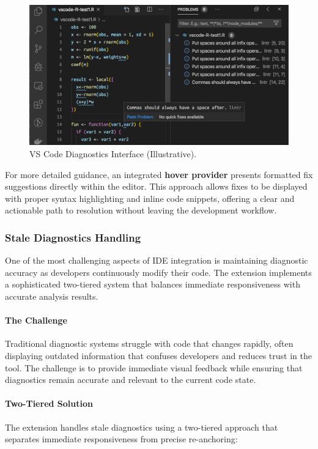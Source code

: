 \begin{spacing}{1.2}
\begin{figure}[H]
    \centering
    \includegraphics[scale=0.4]{Images/vscode_diagnostics.png}
    \caption{VS Code Diagnostics Interface (Illustrative).}
    \label{fig:diagnostics_example}
\end{figure}

For more detailed guidance, an integrated \textbf{hover provider} presents formatted fix suggestions directly within the editor. This approach allows fixes to be displayed with proper syntax highlighting and inline code snippets, offering a clear and actionable path to resolution without leaving the development workflow.

\subsubsection{Stale Diagnostics Handling}
One of the most challenging aspects of IDE integration is maintaining diagnostic accuracy as developers continuously modify their code. The extension implements a sophisticated two-tiered system that balances immediate responsiveness with accurate analysis results.

\paragraph{The Challenge}
Traditional diagnostic systems struggle with code that changes rapidly, often displaying outdated information that confuses developers and reduces trust in the tool. The challenge is to provide immediate visual feedback while ensuring that diagnostics remain accurate and relevant to the current code state.

\paragraph{Two-Tiered Solution}  
The extension handles stale diagnostics using a two-tiered approach that separates immediate responsiveness from precise re-anchoring:  


\end{spacing}
